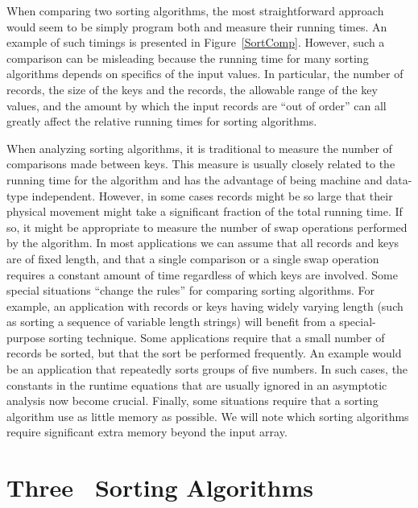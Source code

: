 When comparing two sorting algorithms, the most straightforward
approach would seem to be simply program both and measure their
running times.
An example of such timings is presented in Figure~\ref{SortComp}.
However, such a comparison can be misleading because the running time
for many sorting algorithms depends on specifics of the input values.
In particular, the number of records, the size of the keys
and the records, the allowable range of the key values, and the amount
by which the input records are ``out of order'' can all greatly affect
the relative running times for sorting algorithms.

When analyzing sorting algorithms, it is traditional to measure
the number of comparisons made between keys.
This measure is usually closely related to the running time for
the algorithm and has the advantage of being machine and data-type
independent.
However, in some cases records might be so large that their physical
movement might take a significant fraction of the total running time.
If so, it might be appropriate to measure the number of
swap operations performed by the algorithm.
In most applications we can assume that all records and keys are of
fixed length, and that a single comparison or a single swap operation
requires a constant amount of time regardless of which keys are
involved.
Some special situations ``change the rules'' for comparing sorting
algorithms.
For example, an application with records or keys having widely
varying length (such as sorting a sequence of variable length strings)
will benefit from a special-purpose sorting
technique.
Some applications require that a small number of records be
sorted, but that the sort be performed frequently.
An example would be an application that repeatedly sorts groups of
five numbers.
In such cases, the constants in the runtime equations that are usually
ignored in an asymptotic analysis now become crucial.
Finally, some situations require that a sorting algorithm use as
little memory as possible.
We will note which sorting algorithms require significant extra memory
beyond the input array.

\section{Three \boldmath\Thetantwo\ Sorting Algorithms}
\label{SlowSortSec}

